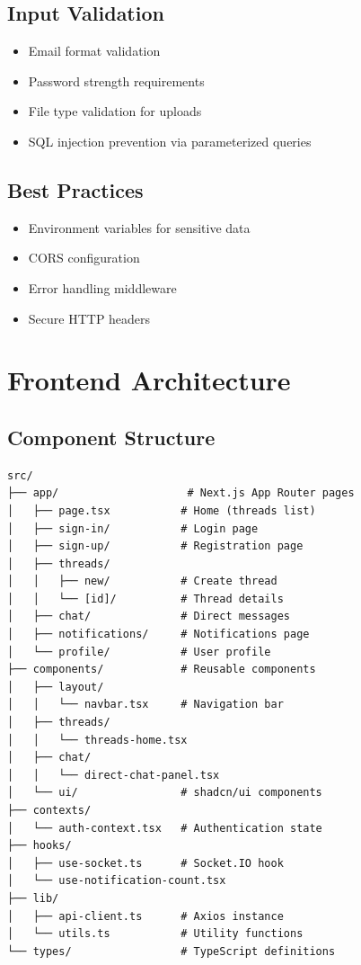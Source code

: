 \documentclass[11pt,a4paper]{article}
\begin{document}
\subsection{Input Validation}
\begin{itemize}[leftmargin=*]
    \item Email format validation
    \item Password strength requirements
    \item File type validation for uploads
    \item SQL injection prevention via parameterized queries
\end{itemize}

\subsection{Best Practices}
\begin{itemize}[leftmargin=*]
    \item Environment variables for sensitive data
    \item CORS configuration
    \item Error handling middleware
    \item Secure HTTP headers
\end{itemize}

\section{Frontend Architecture}

\subsection{Component Structure}
\begin{verbatim}
src/
├── app/                    # Next.js App Router pages
│   ├── page.tsx           # Home (threads list)
│   ├── sign-in/           # Login page
│   ├── sign-up/           # Registration page
│   ├── threads/
│   │   ├── new/           # Create thread
│   │   └── [id]/          # Thread details
│   ├── chat/              # Direct messages
│   ├── notifications/     # Notifications page
│   └── profile/           # User profile
├── components/            # Reusable components
│   ├── layout/
│   │   └── navbar.tsx     # Navigation bar
│   ├── threads/
│   │   └── threads-home.tsx
│   ├── chat/
│   │   └── direct-chat-panel.tsx
│   └── ui/                # shadcn/ui components
├── contexts/
│   └── auth-context.tsx   # Authentication state
├── hooks/
│   ├── use-socket.ts      # Socket.IO hook
│   └── use-notification-count.tsx
├── lib/
│   ├── api-client.ts      # Axios instance
│   └── utils.ts           # Utility functions
└── types/                 # TypeScript definitions
\end{verbatim}
\end{document}
